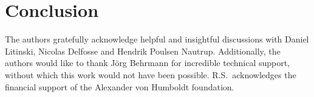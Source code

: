 \documentclass[onecolumn,preprintnumbers,amsmath,amssymb,notitlepage,nofootinbib,longbibliography,superscriptaddress]{revtex4-1}
\begin{document}
\section{Conclusion}\label{s:conclusions}


\begin{acknowledgments}
The authors gratefully acknowledge helpful and insightful discussions with Daniel Litinski, Nicolas Delfosse and Hendrik Poulsen Nautrup. Additionally, the authors would like to thank J\"{o}rg Behrmann for incredible technical support, without which this work would not have been possible. R.S.\ acknowledges the financial support of the Alexander von Humboldt foundation.
\end{acknowledgments}	


\end{document}
